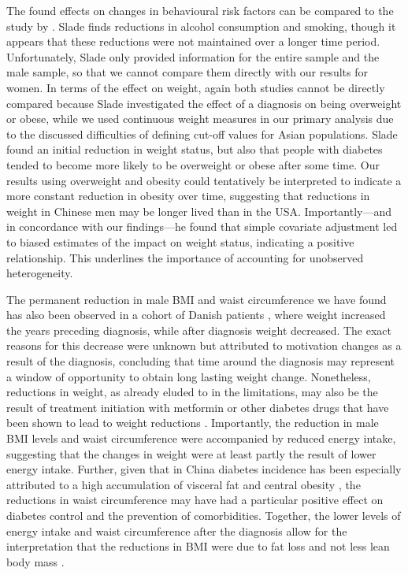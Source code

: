 The found effects on changes in behavioural risk factors can be compared to the study by \parencite{Slade2012}. Slade finds reductions in alcohol consumption and smoking, though it appears that these reductions were not maintained over a longer time period. Unfortunately, Slade only provided information for the entire sample and the male sample, so that we cannot compare them directly with our results for women. In terms of the effect on weight, again both studies cannot be directly compared because Slade investigated the effect of a diagnosis on being overweight or obese, while we used continuous weight measures in our primary analysis due to the discussed difficulties of defining cut-off values for Asian populations. Slade found an initial reduction in weight status, but also that people with diabetes tended to become more likely to be overweight or obese after some time. Our results using overweight and obesity could tentatively be interpreted to indicate a more constant reduction in obesity over time, suggesting that reductions in weight in Chinese men may be longer lived than in the USA. Importantly---and in concordance with our findings---he found that simple covariate adjustment led to biased estimates of the impact on weight status, indicating a positive relationship. This underlines the importance of accounting for unobserved heterogeneity.

The permanent reduction in male \ac{BMI} and waist circumference we have found has also been observed in a cohort of Danish patients \autocite{DeFineOlivarius2015}, where weight increased the years preceding diagnosis, while after diagnosis weight decreased. The exact reasons for this decrease were unknown but attributed to motivation changes as a result of the diagnosis, concluding that time around the diagnosis may represent a window of opportunity to obtain long lasting weight change. Nonetheless, reductions in weight, as already eluded to in the limitations, may also be the result of treatment initiation with metformin or other diabetes drugs that have been shown to lead to weight reductions \autocite{Yang2014}. Importantly, the reduction in male \ac{BMI} levels and waist circumference were accompanied by reduced energy intake, suggesting that the changes in weight were at least partly the result of lower energy intake.  Further, given that in China diabetes incidence has been especially attributed to a high accumulation of visceral fat and central obesity \autocite{Ma2014}, the reductions in waist circumference may have had a particular positive effect on diabetes control and the prevention of comorbidities. Together, the lower levels of energy intake and waist circumference after the diagnosis allow for the interpretation that the reductions in \ac{BMI} were due to fat loss and not less lean body mass \autocite{Klein2007}. 

